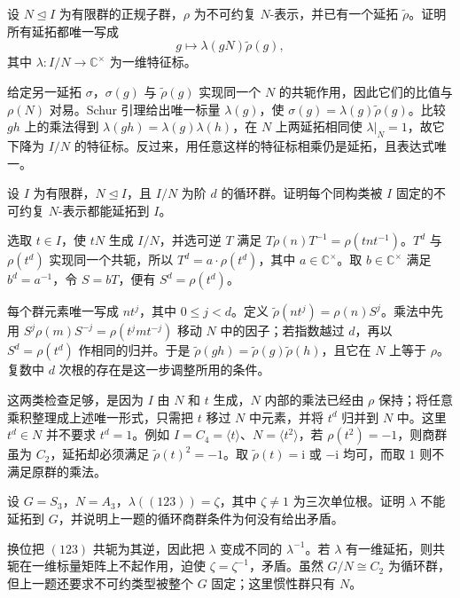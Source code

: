 \begin{exercise}\label{b5:ex:04-extension-torsor}
	设 \(N\trianglelefteq I\) 为有限群的正规子群，\(\rho\) 为不可约复 \(N\)-表示，并已有一个延拓 \(\widetilde\rho\)。证明所有延拓都唯一写成
	\[
		g\longmapsto\lambda(gN)\widetilde\rho(g),
	\]
	其中 \(\lambda:I/N\to\mathbb C^\times\) 为一维特征标。
\end{exercise}
\begin{solution}
	给定另一延拓 \(\sigma\)，\(\sigma(g)\) 与 \(\widetilde\rho(g)\) 实现同一个 \(N\) 的共轭作用，因此它们的比值与 \(\rho(N)\) 对易。Schur 引理给出唯一标量 \(\lambda(g)\)，使 \(\sigma(g)=\lambda(g)\widetilde\rho(g)\)。比较 \(gh\) 上的乘法得到 \(\lambda(gh)=\lambda(g)\lambda(h)\)，在 \(N\) 上两延拓相同使 \(\lambda|_N=1\)，故它下降为 \(I/N\) 的特征标。反过来，用任意这样的特征标相乘仍是延拓，且表达式唯一。
\end{solution}

\begin{exercise}\label{b5:ex:04-cyclic-quotient-extension}
	设 \(I\) 为有限群，\(N\trianglelefteq I\)，且 \(I/N\) 为阶 \(d\) 的循环群。证明每个同构类被 \(I\) 固定的不可约复 \(N\)-表示都能延拓到 \(I\)。
\end{exercise}
\begin{solution}
	选取 \(t\in I\)，使 \(tN\) 生成 \(I/N\)，并选可逆 \(T\) 满足 \(T\rho(n)T^{-1}=\rho(tnt^{-1})\)。\(T^d\) 与 \(\rho(t^d)\) 实现同一个共轭，所以 \(T^d=a\cdot\rho(t^d)\)，其中 \(a\in\mathbb C^\times\)。取 \(b\in\mathbb C^\times\) 满足 \(b^d=a^{-1}\)，令 \(S=bT\)，便有 \(S^d=\rho(t^d)\)。

	每个群元素唯一写成 \(nt^j\)，其中 \(0\leq j<d\)。定义 \(\widetilde\rho(nt^j)=\rho(n)S^j\)。乘法中先用 \(S^j\rho(m)S^{-j}=\rho(t^jmt^{-j})\) 移动 \(N\) 中的因子；若指数越过 \(d\)，再以 \(S^d=\rho(t^d)\) 作相同的归并。于是 \(\widetilde\rho(gh)=\widetilde\rho(g)\widetilde\rho(h)\)，且它在 \(N\) 上等于 \(\rho\)。复数中 \(d\) 次根的存在是这一步调整所用的条件。

	这两类检查足够，是因为 \(I\) 由 \(N\) 和 \(t\) 生成，\(N\) 内部的乘法已经由 \(\rho\) 保持；将任意乘积整理成上述唯一形式，只需把 \(t\) 移过 \(N\) 中元素，并将 \(t^d\) 归并到 \(N\) 中。这里 \(t^d\in N\) 并不要求 \(t^d=1\)。例如 \(I=C_4=\langle t\rangle\)、\(N=\langle t^2\rangle\)，若 \(\rho(t^2)=-1\)，则商群虽为 \(C_2\)，延拓却必须满足 \(\widetilde\rho(t)^2=-1\)。取 \(\widetilde\rho(t)=\mathrm i\) 或 \(-\mathrm i\) 均可，而取 \(1\) 则不满足原群的乘法。
\end{solution}

\begin{exercise}\label{b5:ex:04-invariant-needed}
	设 \(G=S_3\)，\(N=A_3\)，\(\lambda((123))=\zeta\)，其中 \(\zeta\neq1\) 为三次单位根。证明 \(\lambda\) 不能延拓到 \(G\)，并说明上一题的循环商群条件为何没有给出矛盾。
\end{exercise}
\begin{solution}
	换位把 \((123)\) 共轭为其逆，因此把 \(\lambda\) 变成不同的 \(\lambda^{-1}\)。若 \(\lambda\) 有一维延拓，则共轭在一维标量矩阵上不起作用，迫使 \(\zeta=\zeta^{-1}\)，矛盾。虽然 \(G/N\cong C_2\) 为循环群，但上一题还要求不可约类型被整个 \(G\) 固定；这里惯性群只有 \(N\)。
\end{solution}

